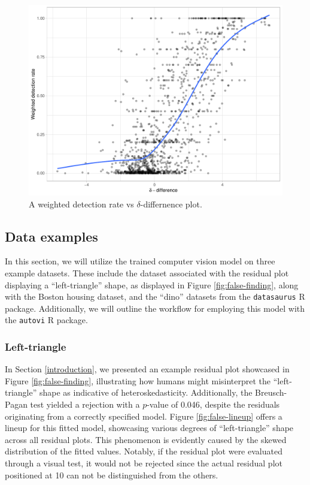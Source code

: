 \documentclass[]{interact}
\theoremstyle{plain}%
\theoremstyle{definition}
\theoremstyle{remark}
\begin{document}
\begin{figure}[!h]

{\centering \includegraphics[width=1\linewidth]{paper_files/figure-latex/delta-1} 

}

\caption{A weighted detection rate vs $\delta$-differnence plot.}\label{fig:delta}
\end{figure}

\hypertarget{data-examples}{%
\subsection{Data examples}\label{data-examples}}

In this section, we will utilize the trained computer vision model on
three example datasets. These include the dataset associated with the
residual plot displaying a ``left-triangle'' shape, as displayed in
Figure \ref{fig:false-finding}, along with the Boston housing dataset,
and the ``dino'' datasets from the \texttt{datasaurus} R package.
Additionally, we will outline the workflow for employing this model with
the \texttt{autovi} R package.

\hypertarget{left-triangle}{%
\subsubsection{Left-triangle}\label{left-triangle}}

In Section \ref{introduction}, we presented an example residual plot
showcased in Figure \ref{fig:false-finding}, illustrating how humans
might misinterpret the ``left-triangle'' shape as indicative of
heteroskedasticity. Additionally, the Breusch-Pagan test yielded a
rejection with a \(p\)-value of 0.046, despite the residuals originating
from a correctly specified model. Figure \ref{fig:false-lineup} offers a
lineup for this fitted model, showcasing various degrees of
``left-triangle'' shape across all residual plots. This phenomenon is
evidently caused by the skewed distribution of the fitted values.
Notably, if the residual plot were evaluated through a visual test, it
would not be rejected since the actual residual plot positioned at 10
can not be distinguished from the others.
\end{document}
